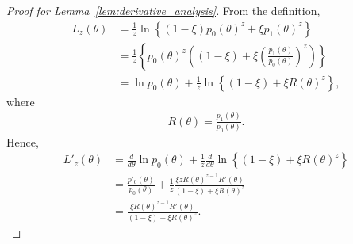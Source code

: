\documentclass[12pt]{article}
\begin{document}
\begin{proof}[Proof for Lemma~\ref{lem:derivative_analysis}]
    From the definition,
    \begin{align*}
        L_z(\theta) &= \frac{1}{z} \ln \left\{(1 - \xi) p_0(\theta)^z + \xi p_1(\theta)^z \right\} \\
        &= \frac{1}{z}\left\{p_0(\theta)^z\left((1 - \xi) + \xi\left(\frac{p_1(\theta)}{p_0(\theta)}\right)^z\right)\right\} \\
        &= \ln p_0(\theta) + \frac{1}{z}\ln\left\{(1 - \xi) + \xi R(\theta)^z \right\},
    \end{align*}
    where
    \begin{align*}
        R(\theta) = \frac{p_1(\theta)}{p_0(\theta)}.
    \end{align*}
    Hence,
    \begin{align*}
        L'_z(\theta) &= \frac{d}{d\theta}\ln p_0(\theta) + \frac{1}{z}\frac{d}{d\theta}\ln\left\{(1 - \xi) + \xi R(\theta)^z \right\} \\
        &= \frac{p'_0(\theta)}{p_0(\theta)} + \frac{1}{z}\frac{\xi z R(\theta)^{z-1}R'(\theta)}{(1 - \xi) + \xi R(\theta)^z} \\
        &= \frac{\xi R(\theta)^{z - 1} R'(\theta)}{(1 - \xi) + \xi R(\theta)^z}.
    \end{align*}
\end{proof}
\end{document}
